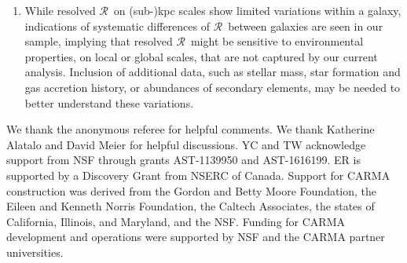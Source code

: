 \documentclass{emulateapj}
\def\rtt{$\mathcal{R}$}
\begin{document}
\begin{enumerate}
\item  
While resolved \rtt \ on (sub-)kpc scales 
show limited variations within a galaxy,   
indications of systematic differences of \rtt \ between galaxies 
are seen in our sample, implying that resolved \rtt \ 
might be sensitive to  
environmental properties, on local
or global scales, that are not captured by
our current analysis.  Inclusion of additional
data, such as stellar mass, star formation
and gas accretion history, or abundances of 
secondary elements, may be needed to better 
understand these variations.
 
\end{enumerate}

\acknowledgments
We thank the anonymous referee for helpful comments. 
We thank Katherine Alatalo and David Meier for helpful discussions. 
YC and TW acknowledge support from NSF through grants AST-1139950 and AST-1616199. 
ER is supported by a Discovery Grant from NSERC of Canada.
Support for CARMA construction was derived from the Gordon and Betty Moore Foundation, the Eileen and Kenneth Norris Foundation, the Caltech Associates, the states of California, Illinois, and Maryland, and the NSF. Funding for CARMA development and operations were supported by NSF and the CARMA partner universities. 



\end{document}
